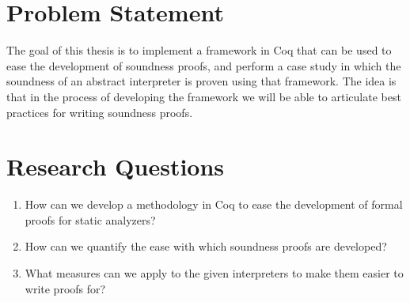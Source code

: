 \section{Problem Statement}
The goal of this thesis is to implement a framework in Coq that can be used to 
ease the development of soundness
proofs, and perform a case study in which the soundness of an abstract
interpreter is proven using that framework. The idea is that in the process of
developing the framework we will be able to articulate best practices for
writing soundness proofs.

\section{Research Questions}

\begin{center}
	\begin{enumerate}
		\item
How can we develop a methodology in Coq to ease the development of
formal proofs for static analyzers?

		\item
	How can we quantify the ease with which soundness proofs are developed?

		\item
	What measures can we apply to the given interpreters to make them easier to
	write proofs for?
	\end{enumerate}
\end{center}
